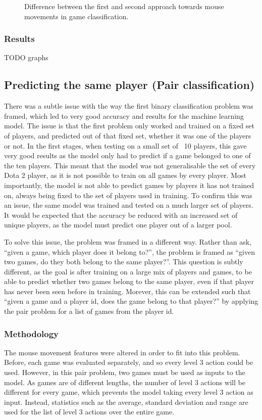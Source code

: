 \documentclass{../sty/SizheArticle}
\begin{document}
\begin{figure}[H]
\caption{Difference between the first and second approach towards mouse movements in game classification.}
\end{figure}

\subsubsection{Results}
TODO graphs



\subsection{Predicting the same player (Pair classification)}
There was a subtle issue with the way the first binary classification problem was framed, which led to very good accuracy and results for the machine learning model. The issue is that the first problem only worked and trained on a fixed set of players, and predicted out of that fixed set, whether it was one of the players or not. In the first stages, when testing on a small set of ~10 players, this gave very good results as the model only had to predict if a game belonged to one of the ten players. This meant that the model was not generalisable the set of every Dota 2 player, as it is not possible to train on all games by every player. Most importantly, the model is not able to predict games by players it has not trained on, always being fixed to the set of players used in training. To confirm this was an issue, the same model was trained and tested on a much larger set of players. It would be expected that the accuracy be reduced with an increased set of unique players, as the model must predict one player out of a larger pool.

To solve this issue, the problem was framed in a different way. Rather than ask, ``given a game, which player does it belong to?'', the problem is framed as ``given two games, do they both belong to the same player?''. This question is subtly different, as the goal is after training on a large mix of players and games, to be able to predict whether two games belong to the same player, even if that player has never been seen before in training. Morever, this can be extended such that ``given a game and a player id, does the game belong to that player?'' by applying the pair problem for a list of games from the player id.

\subsubsection{Methodology}
The mouse movement features were altered in order to fit into this problem. Before, each game was evaluated separately, and so every level 3 action could be used. However, in this pair problem, two games must be used as inputs to the model. As games are of different lengths, the number of level 3 actions will be different for every game, which prevents the model taking every level 3 action as input. Instead, statistics such as the average, standard deviation and range are used for the list of level 3 actions over the entire game. 
\end{document}
